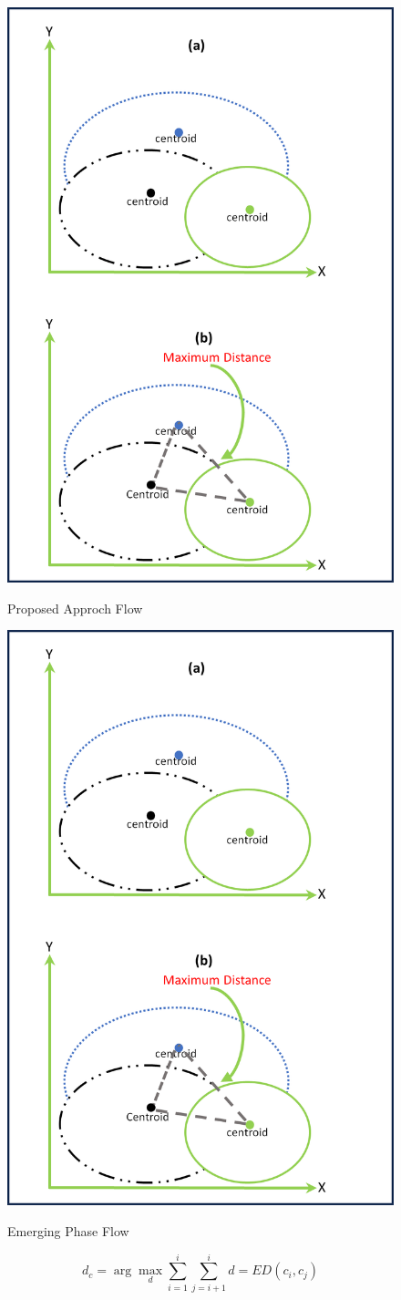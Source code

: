 \begin{figure}[!ht]
	\begin{center}
	\includegraphics[width=0.48\linewidth]{5_Emerging/figures/scenario1.png}
	\caption{Proposed Approch Flow}
	\label{fig:5_scenario1}
	\includegraphics[width=0.48\linewidth]{5_Emerging/figures/senario2.png}
	\caption{Emerging Phase Flow}
	\label{fig:5_scenario2}
\end{center}

\end{figure}

\begin{equation}
	\label{eq:5_first_proposal_1}
    d_c = \arg\max_d \sum_{i=1}^{i} \sum_{j=i+1}^{i} d = ED(c_i, c_j)
\end{equation}


